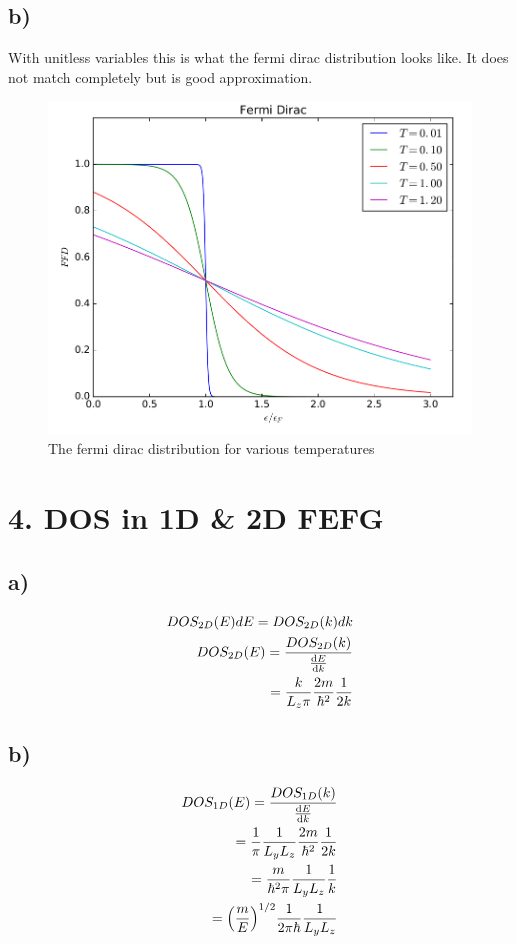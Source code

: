 \documentclass{article}
\begin{document}
\newpage
\subsection*{b)}

With unitless variables this is what the fermi dirac distribution looks like. It does not match completely but is good approximation.

\begin{figure}[H]
	\includegraphics[width = 0.7\linewidth]{fdd.png}
	\centering
	\caption{The fermi dirac distribution for various temperatures}
\end{figure}

\newpage
\section*{4. DOS in 1D \& 2D FEFG}

\subsection*{a)}
\begin{align*}
	DOS_{2D}(E)dE = DOS_{2D}(k)dk\\
	DOS_{2D}(E) = \frac{DOS_{2D}(k)}{\dv{E}{k}}\\
	= \frac{k}{L_z\pi}\frac{2m}{\hbar^2}\frac{1}{2k}
\end{align*}

\subsection*{b)}
\begin{align*}
	DOS_{1D}(E) = \frac{DOS_{1D}(k)}{\dv{E}{k}}\\
	= \frac{1}{\pi}\frac{1}{L_y L_z}\frac{2m}{\hbar^2}\frac{1}{2k}\\
	= \frac{m}{\hbar^2\pi}\frac{1}{L_y L_z} \frac{1}{k}\\
	= \qty(\frac{m}{E})^{1/2}\frac{1}{2\pi\hbar}\frac{1}{L_y L_z}
\end{align*}
\end{document}
